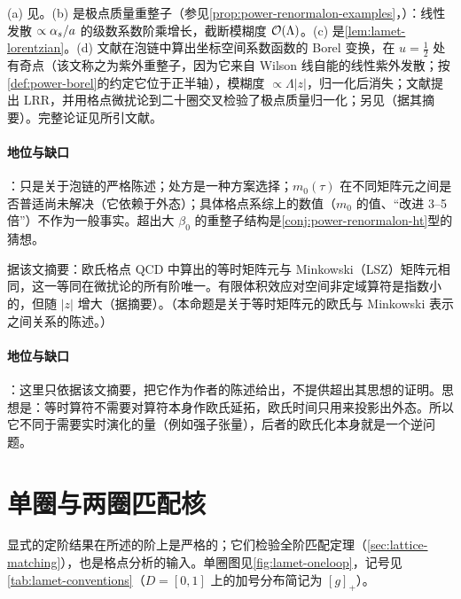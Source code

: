\begin{proofsketch}
(a) 见\cite{Ji:2020brr}。(b) 是极点质量重整子\cite{Beneke:1994sw,Bigi:1994em}（参见\cref{prop:power-renormalon-examples}，\tagP）：线性发散 $\propto\alpha_s/a$ 的级数系数阶乘增长，截断模糊度 $\mathcal{O}\!\left(\Lambda\right)$。(c) 是\cref{lem:lamet-lorentzian}。(d) 文献\cite{Braun:2018brg}在泡链中算出坐标空间系数函数的 Borel 变换，在 $u=\frac12$ 处有奇点（该文称之为紫外重整子，因为它来自 Wilson 线自能的线性紫外发散；按\cref{def:power-borel}的约定它位于正半轴），模糊度 $\propto\Lambda|z|$，归一化后消失；文献\cite{Zhang:2023bxs}提出 LRR，并用格点微扰论到二十圈交叉检验了极点质量归一化；另见\cite{Holligan:2023rex}（据其摘要）。完整论证见所引文献。
\end{proofsketch}

\paragraph{地位与缺口}
\tagP：只是关于泡链的严格陈述；处方是一种方案选择；$m_0(\tau)$ 在不同矩阵元之间是否普适尚未解决（它依赖于外态\cite{Zhang:2023bxs}）；具体格点系综上的数值（$m_0$ 的值、“改进 3--5 倍”）不作为一般事实。超出大 $\beta_0$ 的重整子结构是\cref{conj:power-renormalon-ht}型的猜想。

\begin{proposition}\label{prop:lamet-euclid-minkowski}
据该文摘要\cite{Briceno:2017cpo}：欧氏格点 QCD 中算出的等时矩阵元与 Minkowski（LSZ）矩阵元相同，这一等同在微扰论的所有阶唯一。有限体积效应对空间非定域算符是指数小的，但随 $|z|$ 增大（据\cite{Briceno:2018lfj}摘要）。（本命题是关于等时矩阵元的欧氏与 Minkowski 表示之间关系的陈述。）
\end{proposition}

\paragraph{地位与缺口}
\tagA：这里只依据该文摘要，把它作为作者的陈述给出，不提供超出其思想的证明。思想是：等时算符不需要对算符本身作欧氏延拓，欧氏时间只用来投影出外态。所以它不同于需要实时演化的量（例如强子张量），后者的欧氏化本身就是一个逆问题。

\section{单圈与两圈匹配核}\label{sec:lamet-oneloop}

显式的定阶结果在所述的阶上是严格的；它们检验全阶匹配定理（\cref{sec:lattice-matching}），也是格点分析的输入。单圈图见\cref{fig:lamet-oneloop}，记号见\cref{tab:lamet-conventions}（$D=[0,1]$ 上的加号分布简记为 $[g]_+$）。

